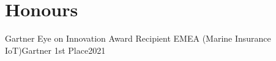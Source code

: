 \section{Honours}
  \resumeSubHeadingListStart
    \resumeSubheading
      {Gartner Eye on Innovation Award Recipient EMEA (Marine Insurance IoT)}{Gartner}
      {1st Place}{2021}

  \resumeSubHeadingListEnd